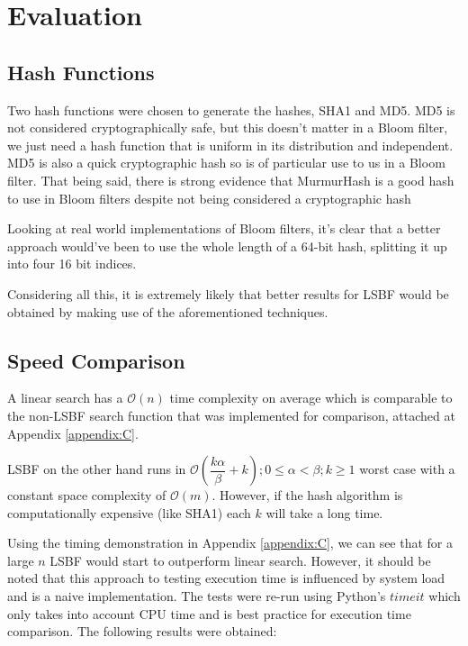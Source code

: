 \chapter{Evaluation}
\label{Evaluation}

\section{Hash Functions}

Two hash functions were chosen to generate the hashes, SHA1 and MD5. MD5 is not considered cryptographically safe, but this doesn't matter in a Bloom filter, we just need a hash function that is uniform in its distribution and independent. MD5 is also a quick cryptographic hash so is of particular use to us in a Bloom filter. That being said, there is strong evidence that MurmurHash is a good hash to use in Bloom filters \cite{MurmurvsCryptoSpeed} despite not being considered a cryptographic hash

Looking at real world implementations of Bloom filters, it's clear that a better approach would've been to use the whole length of a 64-bit hash, splitting it up into four 16 bit indices.\cite{SquidBloom}

Considering all this, it is extremely likely that better results for LSBF would be obtained by making use of the aforementioned techniques.

\section{Speed Comparison}

A linear search has a $\mathcal{O}(n)$ time complexity on average which is comparable to the non-LSBF search function that was implemented for comparison, attached at Appendix \ref{appendix:C}.

LSBF on the other hand runs in $\mathcal{O}(\dfrac{k\alpha}{\beta}+k); 0 \leq \alpha < \beta; k \geq 1$ worst case with a constant space complexity of $\mathcal{O}(m)$. However, if the hash algorithm is computationally expensive (like SHA1) each $k$ will take a long time.

Using the timing demonstration in Appendix \ref{appendix:C}, we can see that for a large $n$ LSBF would start to outperform linear search. However, it should be noted that this approach to testing execution time is influenced by system load and is a naive implementation. The tests were re-run using Python's $timeit$ which only takes into account CPU time and is best practice for execution time comparison. The following results were obtained:

